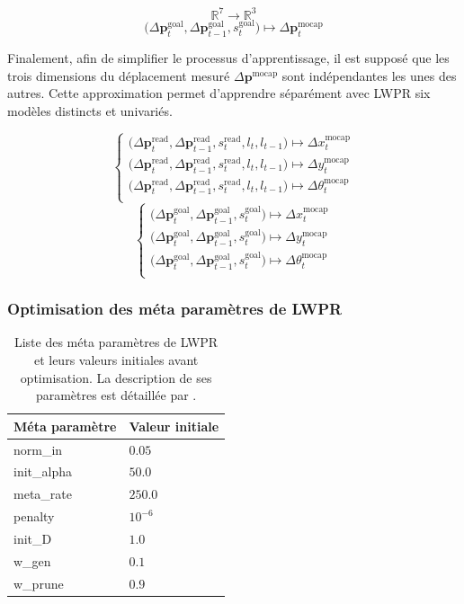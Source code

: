 $$
\mathbb{R}^7 \longrightarrow \mathbb{R}^3
$$
$$
\big(\Delta \bm{p}_{t}^{\text{goal}}, \Delta \bm{p}_{t-1}^{\text{goal}}, s_{t}^{\text{goal}}\big) 
\longmapsto \Delta \bm{p}_{t}^{\text{mocap}}
$$

Finalement, afin de simplifier le processus d'apprentissage, il est supposé que
les trois dimensions du déplacement mesuré $\Delta \bm{p}^{\text{mocap}}$ sont
indépendantes les unes des autres.
Cette approximation permet d'apprendre séparément avec LWPR six modèles distincts et univariés.

$$
\begin{cases}
\big(\Delta \bm{p}_{t}^{\text{read}}, \Delta \bm{p}_{t-1}^{\text{read}}, s_{t}^{\text{read}}, l_{t}, l_{t-1}\big) 
\longmapsto \Delta x_{t}^{\text{mocap}} \\
\big(\Delta \bm{p}_{t}^{\text{read}}, \Delta \bm{p}_{t-1}^{\text{read}}, s_{t}^{\text{read}}, l_{t}, l_{t-1}\big) 
\longmapsto \Delta y_{t}^{\text{mocap}} \\
\big(\Delta \bm{p}_{t}^{\text{read}}, \Delta \bm{p}_{t-1}^{\text{read}}, s_{t}^{\text{read}}, l_{t}, l_{t-1}\big) 
\longmapsto \Delta \theta_{t}^{\text{mocap}} \\
\end{cases}
$$
$$
\begin{cases}
\big(\Delta \bm{p}_{t}^{\text{goal}}, \Delta \bm{p}_{t-1}^{\text{goal}}, s_{t}^{\text{goal}}\big) 
\longmapsto \Delta x_{t}^{\text{mocap}} \\
\big(\Delta \bm{p}_{t}^{\text{goal}}, \Delta \bm{p}_{t-1}^{\text{goal}}, s_{t}^{\text{goal}}\big) 
\longmapsto \Delta y_{t}^{\text{mocap}} \\
\big(\Delta \bm{p}_{t}^{\text{goal}}, \Delta \bm{p}_{t-1}^{\text{goal}}, s_{t}^{\text{goal}}\big) 
\longmapsto \Delta \theta_{t}^{\text{mocap}} \\
\end{cases}
$$

\subsubsection{Optimisation des méta paramètres de LWPR}

\begin{table}[h]
    \centerfloat
    \small
    \begin{tabular}{|l|l|}
        \hline
        Méta paramètre & Valeur initiale \\
        \hline
        norm\_in & $0.05$ \\
        init\_alpha & $50.0$ \\
        meta\_rate & $250.0$ \\
        penalty & $10^{-6}$ \\
        init\_D & $1.0$ \\
        w\_gen & $0.1$ \\
        w\_prune & $0.9$ \\
        \hline
    \end{tabular}
    \caption{\label{tab:lwpr_meta_params}
        Liste des méta paramètres de LWPR et leurs valeurs initiales avant optimisation.
        La description de ses paramètres est détaillée par \cite{klanke_library_2008}.
    }
\end{table}

